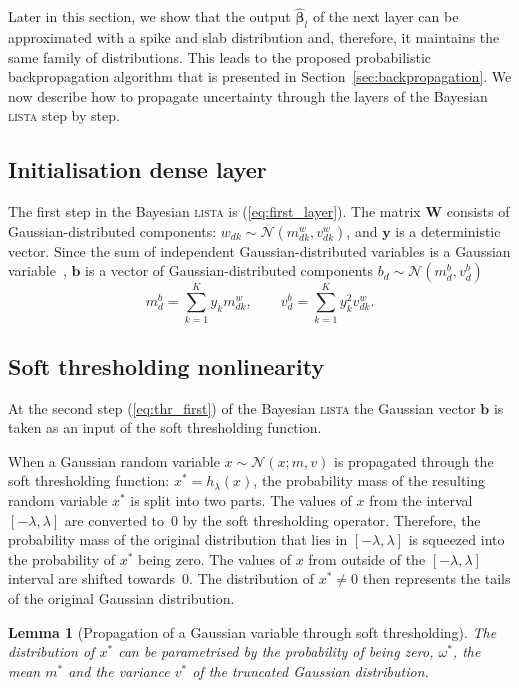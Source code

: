 \documentclass{article}
\newtheorem{lemma}{Lemma}
\begin{document}
Later in this section, we show that the output $\widehat{\boldsymbol\beta}_l$ of the next layer can be approximated with a spike and slab distribution and, therefore, it maintains the same family of distributions. This leads to the proposed probabilistic backpropagation algorithm that is presented in Section~\ref{sec:backpropagation}. We now describe how to propagate uncertainty through the layers of the Bayesian \textsc{lista} step by step.

\subsection{Initialisation dense layer}
The first step in the Bayesian \textsc{lista} is (\ref{eq:first_layer}). The matrix $\mathbf{W}$ consists of Gaussian-distributed components: $w_{dk} \sim \mathcal{N}(m^w_{dk}, v^w_{dk})$, and $\mathbf{y}$ is a deterministic vector. Since the sum of independent Gaussian-distributed variables is a Gaussian variable~\citep{eisenberg2008sum}, $\mathbf{b}$ is a vector of Gaussian-distributed components $b_d \sim \mathcal{N}(m^b_d, v^b_d)$
\begin{equation}
\label{eq:matrix_vector_product}
m^b_d = \sum_{k=1}^Ky_k m^w_{dk}, \qquad
v^b_d = \sum_{k=1}^Ky_k^2v^w_{dk}.
\end{equation}


\subsection{Soft thresholding nonlinearity}
At the second step (\ref{eq:thr_first}) of the Bayesian \textsc{lista} the Gaussian vector $\mathbf{b}$ is taken as an input of the soft thresholding function.

When a Gaussian random variable $x \sim \mathcal{N}(x; m, v)$ is propagated through the soft thresholding function: $x^* = h_{\lambda}(x)$, the probability mass of the resulting random variable $x^*$ is split into two parts. The values of $x$ from the interval $[-\lambda, \lambda]$ are converted to~$0$ by the soft thresholding operator. Therefore, the probability mass of the original distribution that lies in $[-\lambda, \lambda]$ is squeezed into the probability of $x^*$ being zero. The values of $x$ from outside of the $[-\lambda, \lambda]$ interval are shifted towards~$0$. The distribution of $x^* \neq 0$ then represents the tails of the original Gaussian distribution.

\begin{lemma}[Propagation of a Gaussian variable through soft thresholding]
\label{thm:soft_thresholding}
The distribution of $x^*$ can be parametrised by the probability of being zero, $\omega^*$, the mean $m^*$ and the variance $v^*$ of the truncated Gaussian distribution.
\end{lemma}
\end{document}
